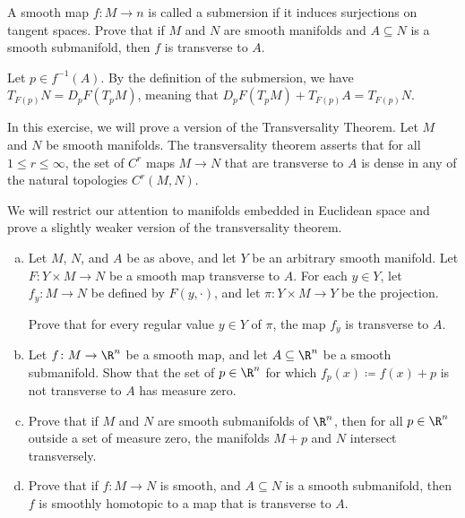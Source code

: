 \documentclass[10pt]{mypackage}
\begin{document}
\RaggedRight
\begin{problem}[Problem 5]
  A smooth map $f\colon M\rightarrow n$ is called a submersion if it induces surjections on tangent spaces. Prove that if $M$ and $N$ are smooth manifolds and $A\subseteq N$ is a smooth submanifold, then $f$ is transverse to $A$.
\end{problem}
\begin{solution}
  Let $p\in f^{-1}\left( A \right)$. By the definition of the submersion, we have $T_{F(p)}N = D_pF\left( T_pM \right)$, meaning that $D_pF\left( T_pM \right) + T_{F(p)}A = T_{F(p)}N$.
\end{solution}
\begin{problem}[Problem 6]
  In this exercise, we will prove a version of the Transversality Theorem. Let $M$ and $N$ be smooth manifolds. The transversality theorem asserts that for all $1\leq r \leq \infty$, the set of $C^{r}$ maps $M\rightarrow N$ that are transverse to $A$ is dense in any of the natural topologies $C^{r}\left( M,N \right)$.\newline

  We will restrict our attention to manifolds embedded in Euclidean space and prove a slightly weaker version of the transversality theorem.
  \begin{enumerate}[(a)]
    \item Let $M$, $N$, and $A$ be as above, and let $Y$ be an arbitrary smooth manifold. Let $F\colon Y\times M\rightarrow N$ be a smooth map transverse to $A$. For each $y\in Y$, let $f_y\colon M\rightarrow N$ be defined by $F\left( y,\cdot \right)$, and let $\pi\colon Y\times M\rightarrow Y$ be the projection.\newline

      Prove that for every regular value $y\in Y$ of $\pi$, the map $f_y$ is transverse to $A$.
    \item Let $f\colon M\rightarrow \R^{n}$ be a smooth map, and let $A\subseteq \R^{n}$ be a smooth submanifold. Show that the set of $p\in \R^{n}$ for which $f_p(x) \coloneq f(x) + p$ is not transverse to $A$ has measure zero.
    \item Prove that if $M$ and $N$ are smooth submanifolds of $\R^n$, then for all $p\in \R^{n}$ outside a set of measure zero, the manifolds $M + p$ and $N$ intersect transversely.
    \item Prove that if $f\colon M\rightarrow N$ is smooth, and $A\subseteq N$ is a smooth submanifold, then $f$ is smoothly homotopic to a map that is transverse to $A$.
  \end{enumerate}
\end{problem}
\end{document}
